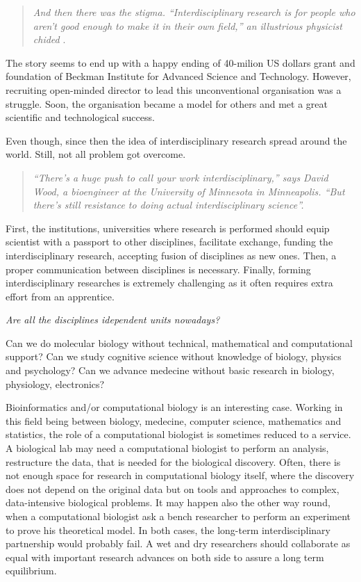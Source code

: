 \documentclass[12pt,]{book}
\theoremstyle{definition}
\theoremstyle{definition}
\theoremstyle{definition}
\theoremstyle{remark}
\begin{document}
\begin{quote}
\emph{And then there was the stigma. ``Interdisciplinary research is for
people who aren't good enough to make it in their own field,'' an
illustrious physicist chided} \citep{Ledford2015}.
\end{quote}

The story seems to end up with a happy ending of 40-milion US dollars
grant and foundation of Beckman Institute for Advanced Science and
Technology. However, recruiting open-minded director to lead this
unconventional organisation was a struggle. Soon, the organisation
became a model for others and met a great scientific and technological
success.

Even though, since then the idea of interdisciplinary research spread
around the world. Still, not all problem got overcome.

\begin{quote}
\emph{``There's a huge push to call your work interdisciplinary,'' says
David Wood, a bioengineer at the University of Minnesota in Minneapolis.
``But there's still resistance to doing actual interdisciplinary
science''.}
\end{quote}

First, the institutions, universities where research is performed should
equip scientist with a passport to other disciplines, facilitate
exchange, funding the interdisciplinary research, accepting fusion of
disciplines as new ones. Then, a proper communication between
disciplines is necessary. Finally, forming interdisciplinary researches
is extremely challenging as it often requires extra effort from an
apprentice.

\emph{Are all the disciplines idependent units nowadays?}

Can we do molecular biology without technical, mathematical and
computational support? Can we study cognitive science without knowledge
of biology, physics and psychology? Can we advance medecine without
basic research in biology, physiology, electronics?

Bioinformatics and/or computational biology is an interesting case.
Working in this field being between biology, medecine, computer science,
mathematics and statistics, the role of a computational biologist is
sometimes reduced to a service. A biological lab may need a
computational biologist to perform an analysis, restructure the data,
that is needed for the biological discovery. Often, there is not enough
space for research in computational biology itself, where the discovery
does not depend on the original data but on tools and approaches to
complex, data-intensive biological problems. It may happen also the
other way round, when a computational biologist ask a bench researcher
to perform an experiment to prove his theoretical model. In both cases,
the long-term interdisciplinary partnership would probably fail. A wet
and dry researchers should collaborate as equal with important research
advances on both side to assure a long term equilibrium.
\end{document}
